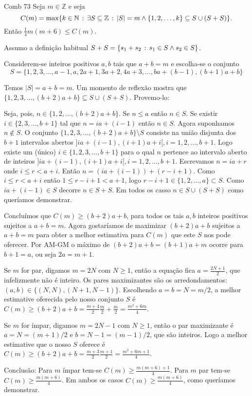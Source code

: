 \documentclass[base.tex]{subfiles}
\begin{document}
\begin{problem}{Comb 73}
Seja $m\in\mathbb{Z}$ e seja
$$C(m)=\max\{k\in\mathbb{N}\,:\,\exists S\subseteq\mathbb{Z}
\,:\, |S|=m\wedge\{1,2,\dots,k\}\subseteq S\cup(S+S)\}.$$
Então $\frac{1}{4}m(m+6)\leq C(m)$.
\end{problem}

\begin{solution}
Assumo a definição habitual $S+S=\{s_1+s_2\,:\, s_1\in S \wedge s_2\in S\}$.

Considerem-se inteiros positivos $a,b$ tais que $a+b=m$ e escolha-se o conjunto
$$S=\{1,2,3,\dots,a-1,a,2a+1,3a+2,4a+3,\dots,ba+(b-1),(b+1)a+b\}$$

Temos $|S|=a+b=m$. Um momento de reflexão mostra que
$\{1,2,3,\dots,(b+2)a+b\}\subseteq S\cup(S+S)$. Provemo-lo:

\begin{anchor}
Seja, pois, $n\in\{1,2,\dots,(b+2)a+b\}$.
Se $n\leq a$ então $n\in S$.
Se existir $i\in\{2,3,\dots,b+1\}$ tal que $n=ia+(i-1)$ então $n\in S$.
Agora suponhamos $n\not\in S$.
O conjunto $\{1,2,3,\dots,(b+2)a+b\}\setminus S$ consiste na união disjunta dos $b+1$ intervalos abertos $]ia+(i-1),(i+1)a+i[, i=1,2,\dots,b+1$.
Logo existe um (único) $i\in\{1,2,3,\dots,b+1\}$ para o qual $n$ pertence ao intervalo aberto de inteiros $]ia+(i-1),(i+1)a+i[, i=1,2,\dots,b+1$.
Escrevamos $n=ia+r$ onde $i\leq r<a+i$. Então $n=(ia+(i-1))+(r-i+1)$.
Como $i\leq r<a+i$ então $1\leq r-i+1<a+1$, logo $r-i+1\in\{1,2,\dots,a\}\subset S$.
Como $ia+(i-1)\in S$ decorre $n\in S+S$. Em todos os casso $n\in S\cup(S+S)$ como queríamos demonstrar.
\end{anchor}

Concluímos que $C(m)\geq(b+2)a+b$, para todos os tais $a,b$ inteiros positivos sujeitos a $a+b=m$.
Agora gostaríamos de maximizar $(b+2)a+b$ sujeitos a $a+b=m$ para obter a melhor estimativa para $C(m)$ que este $S$ nos pode oferecer.
Por AM-GM o máximo de $(b+2)a+b=(b+1)a+m$ ocorre para $b+1=a$, ou seja $2a=m+1$.

Se $m$ for par, digamos $m=2N$ com $N\geq 1$, então a equação fica $a=\frac{2N+1}{2}$, que infelizmente não é inteiro.
Os pares maximizantes são os arredondamentos: $(a,b)\in\{(N,N),(N+1,N-1)\}$.
Escolhendo $a=b=N=m/2$, a melhor estimative oferecida pelo nosso conjunto $S$ é $C(m)\geq(b+2)a+b=\frac{m+4}{2}\frac{m}{2}+\frac{m}{2}=\frac{m^2+6m}{4}$.

Se $m$ for ímpar, digamos $m=2N-1$ com $N\geq 1$, então o par maximizante é $a=N=(m+1)/2$ e $b=N-1=(m-1)/2$, que são inteiros. Logo a melhor estimative que o nosso $S$ oferece é $C(m)\geq(b+2)a+b=\frac{m+3}{2}\frac{m+1}{2}=\frac{m^2+6m+1}{4}$.

Conclusão: Para $m$ ímpar tem-se $C(m)\geq\frac{m(m+6)+1}{4}$. Para $m$ par tem-se $C(m)\geq\frac{m(m+6)}{4}$. Em ambos os casos $C(m)\geq\frac{m(m+6)}{4}$, como queríamos demonstrar.
\end{solution}
\end{document}
